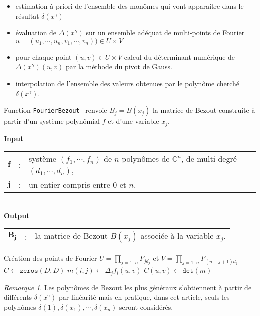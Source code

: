 \documentclass{article}
\theoremstyle{plain}%
\theoremstyle{definition}
\theoremstyle{remark}
\newtheorem*{rem}{Remarque}
\newcommand{\vecb}[1]{\pmb{#1}}
\newcommand{\C}{\mathbb{C}}
\begin{document}
\begin{itemize}
\item estimation à priori de l'ensemble des monômes qui vont apparaitre dans le résultat $\delta(x^\gamma)$
\item évaluation de $\Delta(x^\gamma)$ sur un ensemble adéquat de multi-points de Fourier $u = (u_1,\cdots, u_n, v_1,\cdots, v_n) ) \in U\times V$
\item pour chaque point $(u, v) \in U\times V$ calcul du déterminant numérique de $\Delta(x^\gamma)(u, v)$ par la méthode du pivot de Gauss.
\item interpolation de l'ensemble des valeurs obtenues par le polynôme cherché $\delta(x^\gamma)$.
\end{itemize}

\begin{algorithm}[H]
\caption{Function \texttt{FourierBezout} \ renvoie $B_j = B(x_j)$  la matrice de Bezout construite à partir d'un système polynômial $f$ et d'une variable $x_j$.}\label{algo:01}
\textbf{Input\ }
  \begin{tabular}[t]{lcl}
    $\vecb{f}$  & : &  système $(f_1, \cdots, f_n)$ de $n$ polynômes de $\C^n$, de multi-degré $(d_1, \cdots, d_n)$,\\
     $\vecb{j}$ & : & un entier compris entre $0$ et $n$.
  \end{tabular}\\
\textbf{Output\ }
  \begin{tabular}[t]{lcl}
      $\vecb{B_j}$  & : & la matrice de Bezout $B(x_j)$ associée à la variable $x_j$.
  \end{tabular}
\begin{algorithmic}
	\State Création des points de Fourier $U = \prod_{j=1..n} F_{jd_j}$ et $V = \prod_{j=1..n} F_{(n-j+1)d_j}$
	\State $C \gets \texttt{zeros}(D, D)$
      		\State $m(i, j) \gets \Delta_j f_i(u, v)$
   		\EndFor  
		\State $C(u, v) \gets \texttt{det}(m)$
	\EndFor  
\EndFunction
\end{algorithmic}
\end{algorithm}

\begin{rem}
Les polynômes de Bezout les plus généraux s'obtiennent à partir de différents $\delta(x^\gamma)$ par linéarité mais en pratique, dans cet article, seuls les polynômes $\delta(1),\delta(x_1),\cdots,\delta(x_n)$ seront considérés.
\end{rem}
\end{document}
